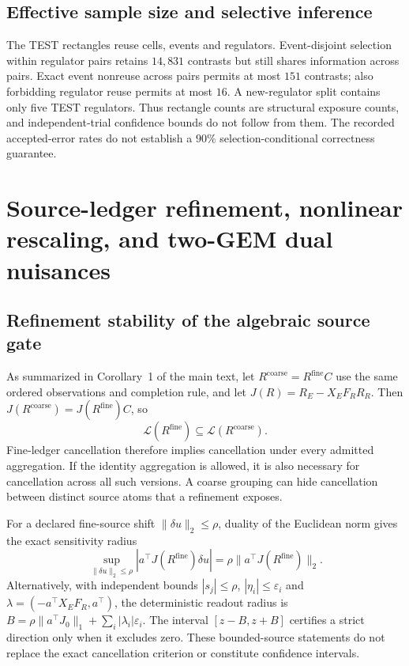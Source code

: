 \subsection{Effective sample size and selective inference}
The TEST rectangles reuse cells, events and regulators. Event-disjoint selection within regulator pairs retains $14{,}831$ contrasts but still shares information across pairs. Exact event nonreuse across pairs permits at most $151$ contrasts; also forbidding regulator reuse permits at most $16$. A new-regulator split contains only five TEST regulators. Thus rectangle counts are structural exposure counts, and independent-trial confidence bounds do not follow from them. The recorded accepted-error rates do not establish a $90\%$ selection-conditional correctness guarantee.

\par
\section{Source-ledger refinement, nonlinear rescaling, and two-GEM dual nuisances}
\label{supp:sources}
\subsection{Refinement stability of the algebraic source gate}
As summarized in Corollary~1 of the main text, let $R^{\mathrm{coarse}}=R^{\mathrm{fine}}C$ use the same ordered observations and completion rule, and let $J(R)=R_E-X_EF_RR_R$. Then $J(R^{\mathrm{coarse}})=J(R^{\mathrm{fine}})C$, so
\[
\mathcal L(R^{\mathrm{fine}})\subseteq\mathcal L(R^{\mathrm{coarse}}).
\]
Fine-ledger cancellation therefore implies cancellation under every admitted aggregation. If the identity aggregation is allowed, it is also necessary for cancellation across all such versions. A coarse grouping can hide cancellation between distinct source atoms that a refinement exposes.

For a declared fine-source shift $\|\delta u\|_2\le\rho$, duality of the Euclidean norm gives the exact sensitivity radius
\begin{equation}\label{eq:source-radius}
\sup_{\|\delta u\|_2\le\rho}|a^\top J(R^{\mathrm{fine}})\delta u|
=\rho\|a^\top J(R^{\mathrm{fine}})\|_2.
\end{equation}
Alternatively, with independent bounds $|s_j|\le\rho$, $|\eta_i|\le\varepsilon_i$ and $\lambda=(-a^\top X_EF_R,a^\top)$, the deterministic readout radius is $B=\rho\|a^\top J_0\|_1+\sum_i|\lambda_i|\varepsilon_i$. The interval $[z-B,z+B]$ certifies a strict direction only when it excludes zero. These bounded-source statements do not replace the exact cancellation criterion or constitute confidence intervals.

